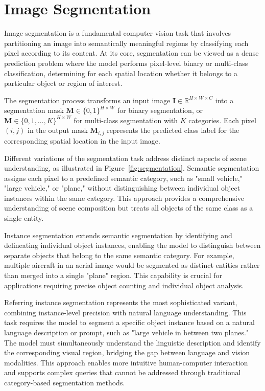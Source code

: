\section{Image Segmentation}

Image segmentation is a fundamental computer vision task that involves partitioning an image into semantically meaningful regions by classifying each pixel according to its content. At its core, segmentation can be viewed as a dense prediction problem where the model performs pixel-level binary or multi-class classification, determining for each spatial location whether it belongs to a particular object or region of interest.

The segmentation process transforms an input image $\mathbf{I} \in \mathbb{R}^{H \times W \times C}$ into a segmentation mask $\mathbf{M} \in \{0, 1\}^{H \times W}$ for binary segmentation, or $\mathbf{M} \in \{0, 1, \ldots, K\}^{H \times W}$ for multi-class segmentation with $K$ categories. Each pixel $(i, j)$ in the output mask $\mathbf{M}_{i,j}$ represents the predicted class label for the corresponding spatial location in the input image.

Different variations of the segmentation task address distinct aspects of scene understanding, as illustrated in Figure~\ref{fig:segmentation}. Semantic segmentation assigns each pixel to a predefined semantic category, such as "small vehicle," "large vehicle," or "plane," without distinguishing between individual object instances within the same category. This approach provides a comprehensive understanding of scene composition but treats all objects of the same class as a single entity.

Instance segmentation extends semantic segmentation by identifying and delineating individual object instances, enabling the model to distinguish between separate objects that belong to the same semantic category. For example, multiple aircraft in an aerial image would be segmented as distinct entities rather than merged into a single "plane" region. This capability is crucial for applications requiring precise object counting and individual object analysis.

Referring instance segmentation represents the most sophisticated variant, combining instance-level precision with natural language understanding. This task requires the model to segment a specific object instance based on a natural language description or prompt, such as "large vehicle in between two planes." The model must simultaneously understand the linguistic description and identify the corresponding visual region, bridging the gap between language and vision modalities. This approach enables more intuitive human-computer interaction and supports complex queries that cannot be addressed through traditional category-based segmentation methods.

